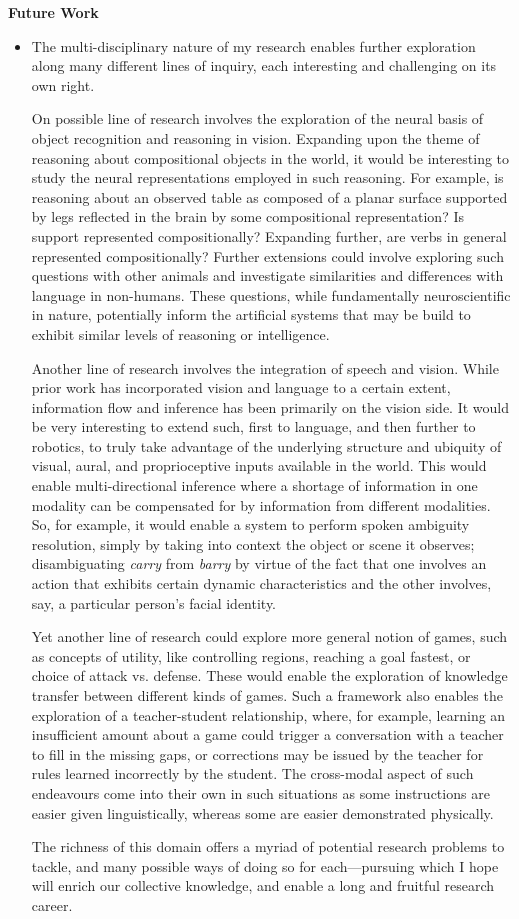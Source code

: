\documentclass[10pt]{article}
\newenvironment{researchBlock}[1]{%
  \vspace*{0.5ex}
  {\noindent\large \textbf{#1}}
  \begin{itemize}\item}
  {\end{itemize}\vspace{3ex}}
\begin{document}
\begin{researchBlock}{Future Work}

  The multi-disciplinary nature of my research enables further exploration
  along many different lines of inquiry, each interesting and challenging on its
  own right.

  On possible line of research involves the exploration of the neural basis of
  object recognition and reasoning in vision.
  Expanding upon the theme of reasoning about compositional objects in the
  world, it would be interesting to study the neural representations employed
  in such reasoning.
  For example, is reasoning about an observed table as composed of a planar
  surface supported by legs reflected in the brain by some compositional
  representation?
  Is support represented compositionally?
  Expanding further, are verbs in general represented compositionally?
  Further extensions could involve exploring such questions with other animals
  and investigate similarities and differences with language in non-humans.
  These questions, while fundamentally neuroscientific in nature, potentially
  inform the artificial systems that may be build to exhibit similar levels of
  reasoning or intelligence.

  Another line of research involves the integration of speech and vision.
  While prior work has incorporated vision and language to a certain extent,
  information flow and inference has been primarily on the vision side.
  It would be very interesting to extend such, first to language, and then
  further to robotics, to truly take advantage of the underlying structure and
  ubiquity of visual, aural, and proprioceptive inputs available in the world.
  This would enable multi-directional inference where a shortage of information
  in one modality can be compensated for by information from different
  modalities.
  So, for example, it would enable a system to perform spoken ambiguity
  resolution, simply by taking into context the object or scene it observes;
  disambiguating \emph{carry} from \emph{barry} by virtue of the fact that one
  involves an action that exhibits certain dynamic characteristics and the other
  involves, say, a particular person's facial identity.

  Yet another line of research could explore more general notion of games, such
  as concepts of utility, like controlling regions, reaching a goal fastest, or
  choice of attack vs. defense.
  These would enable the exploration of knowledge transfer between different
  kinds of games.
  Such a framework also enables the exploration of a teacher-student
  relationship, where, for example, learning an insufficient amount about a game
  could trigger a conversation with a teacher to fill in the missing gaps, or
  corrections may be issued by the teacher for rules learned incorrectly by the
  student.
  The cross-modal aspect of such endeavours come into their own in such
  situations as some instructions are easier given linguistically, whereas some
  are easier demonstrated physically.

  The richness of this domain offers a myriad of potential research problems to
  tackle, and many possible ways of doing so for each---pursuing which I hope
  will enrich our collective knowledge, and enable a long and fruitful research
  career.

\end{researchBlock}
\end{document}
